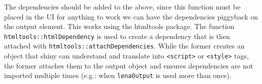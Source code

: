 \documentclass[
]{krantz}
\makeatletter
\newenvironment{Shaded}{\begin{snugshade}}{\end{snugshade}}
\newcommand{\CommentTok}[1]{\textcolor[rgb]{0.37,0.37,0.37}{\textit{#1}}}
\newcommand{\ControlFlowTok}[1]{\textcolor[rgb]{0.27,0.27,0.27}{\textbf{#1}}}
\newcommand{\DataTypeTok}[1]{\textcolor[rgb]{0.27,0.27,0.27}{#1}}
\newcommand{\KeywordTok}[1]{\textcolor[rgb]{0.27,0.27,0.27}{\textbf{#1}}}
\newcommand{\NormalTok}[1]{#1}
\newcommand{\OperatorTok}[1]{\textcolor[rgb]{0.43,0.43,0.43}{\textbf{#1}}}
\newcommand{\StringTok}[1]{\textcolor[rgb]{0.5,0.5,0.5}{#1}}
\newenvironment{kframe}{%
\medskip{}
\setlength{\fboxsep}{.8em}
 \def\at@end@of@kframe{}%
 \ifinner\ifhmode%
  \def\at@end@of@kframe{\end{minipage}}%
  \begin{minipage}{\columnwidth}%
 \fi\fi%
 \def\FrameCommand##1{\hskip\@totalleftmargin \hskip-\fboxsep
 \colorbox{shadecolor}{##1}\hskip-\fboxsep
     \hskip-\linewidth \hskip-\@totalleftmargin \hskip\columnwidth}%
 \MakeFramed {\advance\hsize-\width
   \@totalleftmargin\z@ \linewidth\hsize
   \@setminipage}}%
 {\par\unskip\endMakeFramed%
 \at@end@of@kframe}
\renewenvironment{Shaded}{\begin{kframe}}{\end{kframe}}
\makeatother
\begin{document}
\begin{Shaded}
\end{Shaded}

The dependencies should be added to the above, since this function must be placed in the UI for anything to work we can have the dependencies piggyback on the output element. This works using the htmltools package. The function \texttt{htmltools::htmlDependency} is used to create a dependency that is then attached with \texttt{htmltools::attachDependencies}. While the former creates an object that shiny can understand and translate into \texttt{\textless{}script\textgreater{}} or \texttt{\textless{}style\textgreater{}} tags, the former attaches them to the output object and ensures dependencies are not imported multiple times (e.g.: when \texttt{lenaOutput} is used more than once).

\begin{Shaded}
\end{Shaded}
\end{document}
